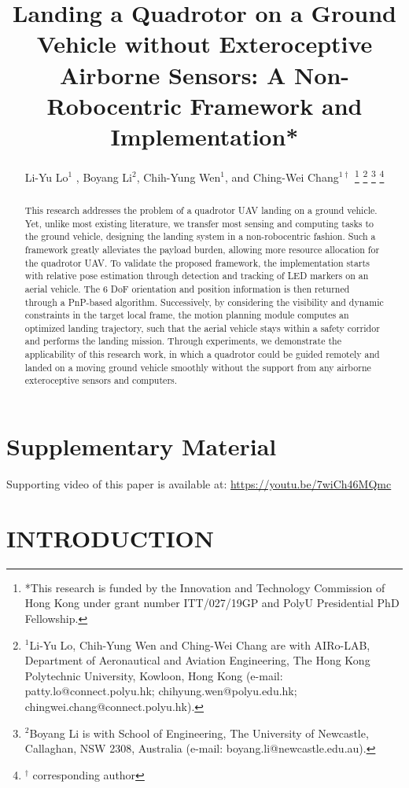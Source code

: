 \documentclass[letterpaper, 10 pt, conference]{ieeeconf}  %
\title{\LARGE \bf
Landing a Quadrotor on a Ground Vehicle without Exteroceptive Airborne Sensors:
A Non-Robocentric Framework and Implementation*
}
\author{Li-Yu Lo$^{1}$ \IEEEmembership{Student Member, IEEE}, Boyang Li$^{2}$, Chih-Yung Wen$^{1}$, and Ching-Wei Chang$^{1\dagger}$ 
\thanks{*This research is funded by the Innovation and Technology Commission of 
Hong Kong under grant number ITT/027/19GP and PolyU
Presidential PhD Fellowship.}
\thanks{$^{1}$Li-Yu Lo, Chih-Yung Wen and Ching-Wei Chang
        are with AIRo-LAB, Department of Aeronautical and Aviation Engineering, 
        The Hong Kong Polytechnic University, 
        Kowloon, Hong Kong 
		(e-mail: patty.lo@connect.polyu.hk; chihyung.wen@polyu.edu.hk; chingwei.chang@connect.polyu.hk).
        }
\thanks{$^{2}$Boyang Li is with 
School of Engineering, The University of Newcastle, 
Callaghan, NSW 2308, Australia 
(e-mail: boyang.li@newcastle.edu.au).
    }%
\thanks{$^{\dagger}$ corresponding author
	}%
}
\begin{document}
\maketitle
\thispagestyle{empty}
\pagestyle{empty}


\begin{abstract}

        This research addresses the problem of a quadrotor UAV landing on a ground vehicle. 
        Yet, unlike most existing literature, 
        we transfer most sensing and computing tasks to the ground vehicle,
        designing the landing system in a non-robocentric fashion.
        Such a framework greatly alleviates the payload burden,
        allowing more resource allocation for the quadrotor UAV. 
        To validate the proposed framework, 
        the implementation starts with relative pose estimation
        through detection and tracking of LED markers on an aerial vehicle. 
        The 6 DoF orientation and position information is 
        then returned through a PnP-based algorithm. 
        Successively, by considering the visibility and dynamic constraints
		in the target local frame, 
        the motion planning module computes an optimized landing trajectory, such 
        that the aerial vehicle stays within a safety corridor and performs the landing mission. 
        Through experiments, we demonstrate the 
        applicability of this research work, 
        in which a quadrotor could be guided remotely and landed on a moving ground 
        vehicle smoothly without the support from any airborne exteroceptive  
		sensors and computers. 

\end{abstract}

\section*{Supplementary Material}
\label{sec:SM}
Supporting video of this paper is available at:  \url{https://youtu.be/7wiCh46MQmc} 



\section{INTRODUCTION}
\cite{lo2021dynamic}\cite{lo2024adaptive}\cite{lo2023landing}
	
\end{document}
